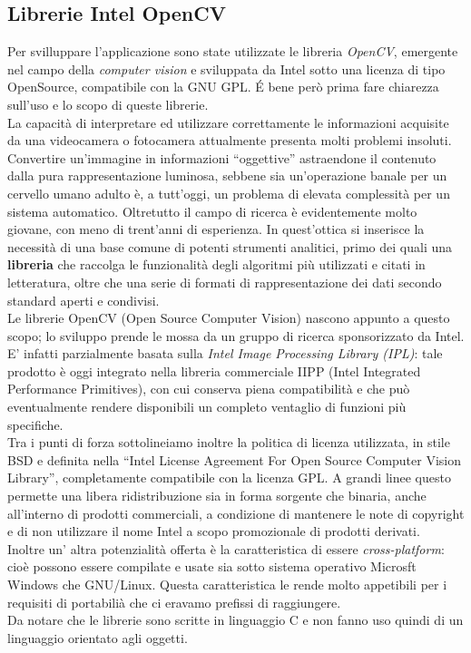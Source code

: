 \subsection{Librerie Intel OpenCV}
Per svilluppare l'applicazione sono state utilizzate le libreria \textit{OpenCV}, emergente nel campo della \textit{computer vision}  e sviluppata da Intel sotto una licenza di tipo OpenSource, compatibile con la GNU GPL.
\'E bene però prima fare chiarezza sull'uso e lo scopo di queste librerie.\\
La capacità di interpretare ed utilizzare correttamente le informazioni acquisite da una videocamera o fotocamera attualmente presenta molti problemi insoluti. Convertire un’immagine in informazioni “oggettive” astraendone il contenuto dalla pura rappresentazione luminosa, sebbene sia un’operazione banale per un cervello umano adulto è, a tutt’oggi, un problema di elevata complessità per un sistema automatico.
Oltretutto il campo di ricerca è evidentemente molto giovane, con meno di trent’anni di esperienza. In quest’ottica si inserisce la necessità di una base comune di potenti strumenti analitici, primo dei quali una \textbf{libreria} che raccolga le funzionalità degli algoritmi più utilizzati e citati in letteratura, oltre che una serie di formati di rappresentazione dei dati secondo standard aperti e condivisi.\\
Le librerie OpenCV (Open Source Computer Vision) nascono appunto a questo scopo; lo sviluppo prende le mossa da un gruppo di ricerca sponsorizzato da Intel. E’ infatti parzialmente basata sulla \textit{Intel Image Processing Library (IPL)}: tale prodotto è oggi integrato nella libreria commerciale IIPP (Intel Integrated Performance Primitives), con cui conserva piena compatibilità e che può eventualmente rendere disponibili un completo ventaglio di funzioni più specifiche.\\
Tra i punti di forza sottolineiamo inoltre la politica di licenza utilizzata, in stile BSD e definita nella ``Intel License Agreement For Open Source Computer Vision Library'', completamente compatibile con la licenza GPL. A grandi linee questo permette una libera ridistribuzione sia in forma sorgente che binaria, anche all’interno di prodotti commerciali, a condizione di mantenere le note di copyright e di non utilizzare il nome Intel a scopo promozionale di prodotti derivati.\\
Inoltre un' altra potenzialità offerta è la caratteristica di essere \textit{cross-platform}: cioè possono essere compilate e usate sia sotto sistema operativo Microsft Windows che GNU/Linux. Questa caratteristica le rende molto appetibili per i requisiti di portabilià che ci eravamo prefissi di raggiungere.\\ Da notare che le librerie sono scritte in linguaggio C e non fanno uso quindi di un linguaggio orientato agli oggetti.

